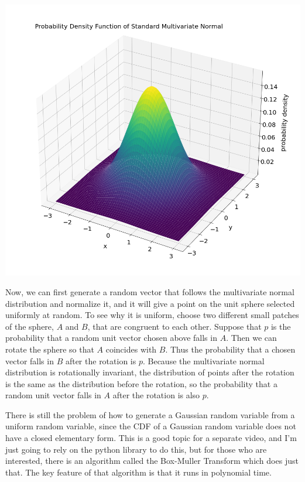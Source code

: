 \documentclass{article}
\begin{document}
\begin{center}
    \includegraphics[scale=0.3]{manim/project/images/Multivariate Normal PDF.png}
\end{center}

Now, we can first generate a random vector that follows the multivariate normal distribution and normalize it, and it will give a point on the unit sphere selected uniformly at random. To see why it is uniform, choose two different small patches of the sphere, $A$ and $B$, that are congruent to each other. Suppose that $p$ is the probability that a random unit vector chosen above falls in $A$. Then we can rotate the sphere so that $A$ coincides with $B$. Thus the probability that a chosen vector falls in $B$ after the rotation is $p$. Because the multivariate normal distribution is rotationally invariant, the distribution of points after the rotation is the same as the distribution before the rotation, so the probability that a random unit vector falls in $A$ after the rotation is also $p$.

There is still the problem of how to generate a Gaussian random variable from a uniform random variable, since the CDF of a Gaussian random variable does not have a closed elementary form. This is a good topic for a separate video, and I'm just going to rely on the python library to do this, but for those who are interested, there is an algorithm called the Box-Muller Transform which does just that. The key feature of that algorithm is that it runs in polynomial time.
\end{document}
